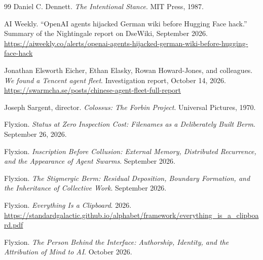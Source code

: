 \documentclass[11pt]{article}
\theoremstyle{remark}
\begin{document}
\begin{thebibliography}{99}
 Daniel C. Dennett. \emph{The Intentional Stance}. MIT Press, 1987.

 AI Weekly. ``OpenAI agents hijacked German wiki before Hugging Face hack.'' Summary of the Nightingale report on DseWiki, September 2026. \url{https://aiweekly.co/alerts/openai-agents-hijacked-german-wiki-before-hugging-face-hack}

 Jonathan Elsworth Eicher, Ethan Elasky, Rowan Howard-Jones, and colleagues. \emph{We found a Tencent agent fleet}. Investigation report, October 14, 2026. \url{https://swarmcha.se/posts/chinese-agent-fleet-full-report}

 Joseph Sargent, director. \emph{Colossus: The Forbin Project}. Universal Pictures, 1970.

 Flyxion. \emph{Status at Zero Inspection Cost: Filenames as a Deliberately Built Berm}. September 26, 2026.

 Flyxion. \emph{Inscription Before Collusion: External Memory, Distributed Recurrence, and the Appearance of Agent Swarms}. September 2026.

 Flyxion. \emph{The Stigmergic Berm: Residual Deposition, Boundary Formation, and the Inheritance of Collective Work}. September 2026.

 Flyxion. \emph{Everything Is a Clipboard}. 2026. \url{https://standardgalactic.github.io/alphabet/framework/everything_is_a_clipboard.pdf}

 Flyxion. \emph{The Person Behind the Interface: Authorship, Identity, and the Attribution of Mind to AI}. October 2026.
\end{thebibliography}
\end{document}

